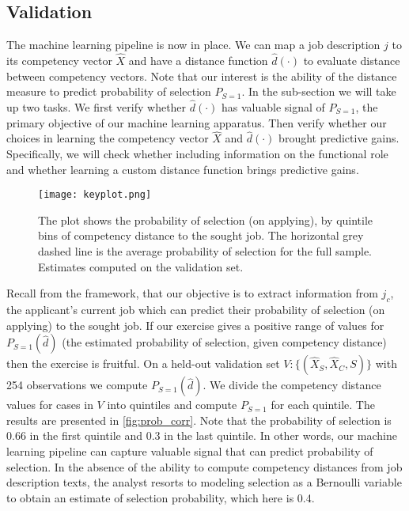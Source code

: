 \documentclass{article}
\begin{document}
\subsection{Validation}


The machine learning pipeline is now in place. We can map a job description \( j \) to its competency vector \( \hat{X} \) and have a distance function \( \hat{d}(\cdot) \) to evaluate distance between competency vectors. Note that our interest is the ability of the distance measure to predict probability of selection \( P_{S=1} \). In the sub-section we will take up two tasks. We first verify whether \( \hat{d}(\cdot) \) has valuable signal of \( P_{S=1} \), the primary objective of our machine learning apparatus. Then verify whether our choices in learning the competency vector \( \hat{X} \) and \( \hat{d}(\cdot) \) brought predictive gains. Specifically, we will check whether including information on the functional role and whether learning a custom distance function brings predictive gains.

\begin{figure}[htb]
    \centering
    \texttt{[image: keyplot.png]} %
    \caption{The plot shows the probability of selection (on applying), by quintile bins of competency distance to the sought job. The horizontal grey dashed line is the average probability of selection for the full sample. Estimates computed on the validation set.} %
    \label{fig:prob_corr} 
\end{figure}


Recall from the framework, that our objective is to extract information from \( j_c \), the applicant’s current job which can predict their probability of selection (on applying) to the sought job. If our exercise gives a positive range of values for \( P_{S=1}(\hat{d}) \) (the estimated probability of selection, given competency distance) then the exercise is fruitful. On a held-out validation set \( V: \{(\hat{X}_S, \hat{X}_C, S)\} \) with 254 observations we compute \( P_{S=1}(\hat{d}) \). We divide the competency distance values for cases in \( V \) into quintiles and compute \( P_{S=1} \) for each quintile. The results are presented in \autoref{fig:prob_corr}. Note that the probability of selection is 0.66 in the first quintile and 0.3 in the last quintile. In other words, our machine learning pipeline can capture valuable signal that can predict probability of selection. In the absence of the ability to compute competency distances from job description texts, the analyst resorts to modeling selection as a Bernoulli variable to obtain an estimate of selection probability, which here is 0.4.
\end{document}
